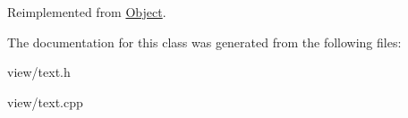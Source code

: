 Reimplemented from \hyperlink{class_object_a13b99ec4da0a1c798104560c492c2a7e}{Object}.



The documentation for this class was generated from the following files\-:\begin{DoxyCompactItemize}
\item 
view/text.\-h\item 
view/text.\-cpp\end{DoxyCompactItemize}
